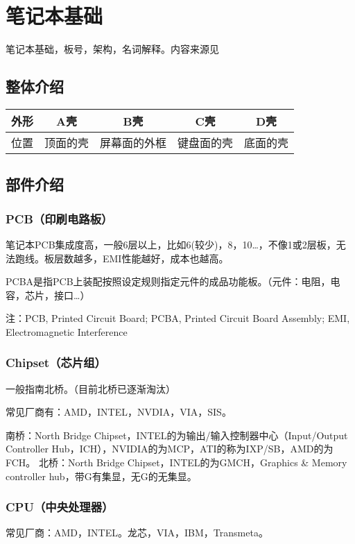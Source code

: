 \chapter{笔记本基础}
\begin{intro}
    笔记本基础，板号，架构，名词解释。内容来源见
\end{intro}
\section{整体介绍}
\begin{tabular}{|*{5}{c|}}
    \hline
    外形 & A壳 & B壳 & C壳 & D壳 \\
    \hline
    位置 & 顶面的壳 & 屏幕面的外框 & 键盘面的壳 & 底面的壳 \\
    \hline
\end{tabular}

\section{部件介绍}
\subsection{PCB（印刷电路板）}

笔记本PCB集成度高，一般6层以上，比如6(较少)，8，10\dots，不像1或2层板，无法跑线。板层数越多，EMI性能越好，成本也越高。

PCBA是指PCB上装配按照设定规则指定元件的成品功能板。（元件：电阻，电容，芯片，接口\dots）

注：PCB, Printed Circuit Board; PCBA, Printed Circuit Board Assembly; EMI, Electromagnetic Interference

\subsection{Chipset（芯片组）}
一般指南北桥。（目前北桥已逐渐淘汰）

常见厂商有：AMD，INTEL，NVDIA，VIA，SIS。

南桥：North Bridge Chipset，INTEL的为输出/输入控制器中心（Input/Output Controller Hub，ICH），NVIDIA的为MCP，ATI的称为IXP/SB，AMD的为FCH。
北桥：North Bridge Chipset，INTEL的为GMCH，Graphics \& Memory controller hub，带G有集显，无G的无集显。

\subsection{CPU（中央处理器）}
常见厂商：AMD，INTEL。龙芯，VIA，IBM，Transmeta。

